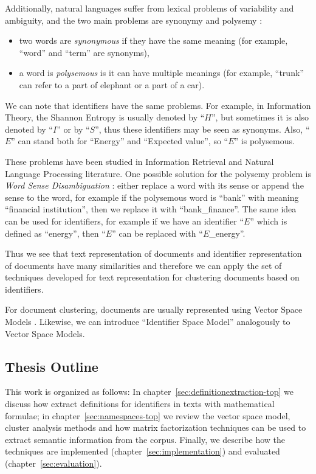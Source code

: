 Additionally, natural languages suffer from lexical problems of variability
and ambiguity, and the two main problems are synonymy and polysemy
\cite{deerwester1990indexing} \cite{gliozzo2009semantic}:

\begin{itemize}
\itemsep1pt\parskip0pt
  \item two words are \emph{synonymous} if they have the same meaning
        (for example, ``word'' and ``term'' are synonyms),
  \item a word is \emph{polysemous} is it can have multiple meanings
        (for example, ``trunk'' can refer to a part of elephant or a part of a car).
\end{itemize}

We can note that identifiers have the same problems. For example,
in Information Theory, the Shannon Entropy is usually denoted by
``$H$'', but sometimes it is also denoted by ``$I$'' or by ``$S$'',
thus these identifiers may be seen as synonyms.
Also, ``$E$'' can stand both for ``Energy'' and ``Expected value'',
so ``$E$'' is polysemous.

These problems have been studied in Information Retrieval and
Natural Language Processing literature.
One possible solution for the polysemy problem is \emph{Word Sense Disambiguation}
\cite{jurafsky2000speech}: either replace a word with its sense
\cite{stokoe2003word} or append the sense to the word, for example
if the polysemous word is ``bank'' with meaning ``financial institution'',
then we replace it with ``bank\_finance''. The same idea can be used
for identifiers, for example if we have an identifier ``$E$'' which is
defined as ``energy'', then ``$E$'' can be replaced with ``$E$\_energy''.

Thus we see that text representation of documents and identifier representation
of documents have many similarities and therefore we can apply the set of
techniques developed for text representation for clustering documents based
on identifiers.

For document clustering, documents are usually represented using
Vector Space Models \cite{oikonomakou2005review} \cite{aggarwal2012survey}.
Likewise, we can introduce ``Identifier Space Model'' analogously to
Vector Space Models.



\subsection{Thesis Outline}


This work is organized as follows:
In chapter~\ref{sec:definitionextraction-top} we discuss how extract
definitions for identifiers in texts with mathematical formulae;
in chapter~\ref{sec:namespaces-top} we review the vector space model,
cluster analysis methods and how matrix factorization techniques can be used 
to extract semantic information from the corpus. 
Finally, we describe how the techniques are implemented 
(chapter~\ref{sec:implementation}) and evaluated (chapter~\ref{sec:evaluation}).


